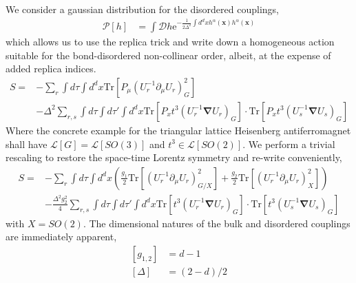 \documentclass[notitlepage,onecolumn,showpacs,11pt]{revtex4-1}
\newcommand{\mbf}[1]{\mathbf{#1}}
\newcommand{\grad}{\boldsymbol{\nabla}}
\newcommand{\Tr}{\text{Tr}}
\begin{document}
We consider a gaussian distribution for the disordered couplings,
\begin{equation}
    \begin{aligned}
        \mathcal{P}\left[h\right]
        &=\int\mathcal{D}h\text{e}^
        {-\frac{1}{2\Delta^2}\int d^dx
        h^\alpha(\mbf{x})
        h^\alpha(\mbf{x})
        }
    \end{aligned}
\end{equation}
which allows us to use the replica trick and write down a homogeneous
action suitable for the bond-disordered non-collinear order, albeit, at
the expense of added replica indices. 
\begin{equation}
    \begin{aligned}
        S =& -\sum_r\int d\tau\int d^dx
        \Tr\left[P_\mu
            \left(U_r^{-1}\partial_\mu U_r\right)_{G}^2
            \right] \\
        &-\Delta^2
        \sum_{r,s}\int d\tau\int d\tau'\int d^dx
        \Tr\left[P_xt^3
            \left(U_r^{-1}\grad U_r\right)_G
            \right]
            \cdot
            \Tr\left[P_xt^3
            \left(U_s^{-1}\grad U_s\right)_G
            \right]
    \end{aligned}
\end{equation}
Where the concrete example for the triangular lattice Heisenberg 
antiferromagnet shall have 
$\mathcal{L}\left[G\right]=\mathcal{L}\left[SO(3)\right]$ and 
$t^3 \in \mathcal{L}\left[SO(2)\right]$. We perform a trivial rescaling 
to restore the space-time Lorentz symmetry and re-write conveniently,
\begin{equation}
    \begin{aligned}
        S =& -\sum_r\int d\tau\int d^dx
        \left(\frac{g_1}{2}\Tr\left[
            \left(U_r^{-1}\partial_\mu U_r\right)_{G/X}^2\right]
        +\frac{g_2}{2}\Tr\left[
            \left(U_r^{-1}\partial_\mu U_r\right)_{X}^2
            \right]
        \right)\\
        &-\frac{\Delta^2g_2^2}{4}
        \sum_{r,s}\int d\tau\int d\tau'\int d^dx
        \Tr\left[t^3
            \left(U_r^{-1}\grad U_r\right)_G
            \right]
            \cdot
            \Tr\left[t^3
            \left(U_s^{-1}\grad U_s\right)_G
            \right]
    \end{aligned}
\end{equation}
with $X=SO(2)$. The dimensional natures of the bulk and disordered couplings 
are immediately apparent,
\begin{equation}
    \begin{aligned}
        \left[g_{1,2}\right] &= d - 1\\
        \left[\Delta\right] &= (2-d)/2
    \end{aligned}
\end{equation}
\end{document}
